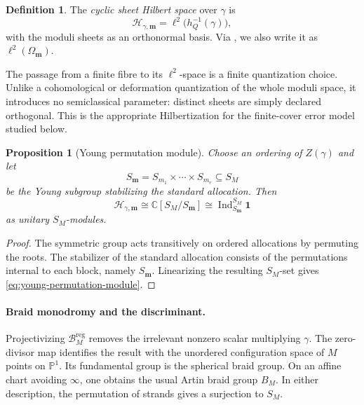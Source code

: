 \documentclass[11pt]{article}
\newtheorem{proposition}[theorem]{Proposition}
\theoremstyle{definition}
\newtheorem{definition}[theorem]{Definition}
\theoremstyle{remark}
\newcommand{\C}{\mathbb C}
\newcommand{\Pp}{\mathbb P}
\newcommand{\cH}{\mathcal H}
\newcommand{\cB}{\mathcal B}
\newcommand{\Ind}{\operatorname{Ind}}
\newcommand{\reg}{\mathrm{reg}}
\begin{document}
\begin{definition}\label{def:sheet-Hilbert}
The \emph{cyclic sheet Hilbert space} over $\gamma$ is
\begin{equation}\label{eq:sheet-Hilbert}
 \cH_{\gamma,\boldsymbol m}=\ell^2\big(h_Q^{-1}(\gamma)\big),
\end{equation}
with the moduli sheets as an orthonormal basis.  Via , we also write it as $\ell^2(\Omega_{\boldsymbol m})$.
\end{definition}

The passage from a finite fibre to its $\ell^2$-space is a finite quantization choice.  Unlike a cohomological or deformation quantization of the whole moduli space, it introduces no semiclassical parameter: distinct sheets are simply declared orthogonal.  This is the appropriate Hilbertization for the finite-cover error model studied below.

\begin{proposition}[Young permutation module]\label{prop:young-permutation-module}
Choose an ordering of $Z(\gamma)$ and let
\[
 S_{\boldsymbol m}=S_{m_1}\times\cdots\times S_{m_r}\subseteq S_M
\]
be the Young subgroup stabilizing the standard allocation.  Then
\begin{equation}\label{eq:young-permutation-module}
 \cH_{\gamma,\boldsymbol m}
 \cong \C[S_M/S_{\boldsymbol m}]
 \cong \Ind_{S_{\boldsymbol m}}^{S_M}\mathbf1
\end{equation}
as unitary $S_M$-modules.
\end{proposition}

\begin{proof}
The symmetric group acts transitively on ordered allocations by permuting the roots.  The stabilizer of the standard allocation consists of the permutations internal to each block, namely $S_{\boldsymbol m}$.  Linearizing the resulting $S_M$-set gives \eqref{eq:young-permutation-module}.
\end{proof}

\paragraph{Braid monodromy and the discriminant.}

Projectivizing $\cB_M^{\reg}$ removes the irrelevant nonzero scalar multiplying $\gamma$.  The zero-divisor map identifies the result with the unordered configuration space of $M$ points on $\Pp^1$.  Its fundamental group is the spherical braid group.  On an affine chart avoiding $\infty$, one obtains the usual Artin braid group $B_M$.  In either description, the permutation of strands gives a surjection to $S_M$.
\end{document}

